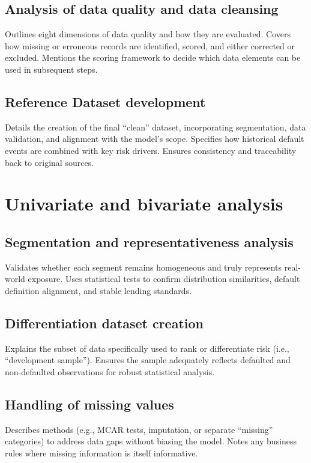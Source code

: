 \documentclass[12pt,a4paper]{article}
\begin{document}
\subsection{Analysis of data quality and data cleansing}
Outlines eight dimensions of data quality and how they are evaluated. Covers how missing or erroneous records are identified, scored, and either corrected or excluded. Mentions the scoring framework to decide which data elements can be used in subsequent steps.

\subsection{Reference Dataset development}
Details the creation of the final “clean” dataset, incorporating segmentation, data validation, and alignment with the model’s scope. Specifies how historical default events are combined with key risk drivers. Ensures consistency and traceability back to original sources.

\section{Univariate and bivariate analysis}

\subsection{Segmentation and representativeness analysis}
Validates whether each segment remains homogeneous and truly represents real-world exposure. Uses statistical tests to confirm distribution similarities, default definition alignment, and stable lending standards.

\subsection{Differentiation dataset creation}
Explains the subset of data specifically used to rank or differentiate risk (i.e., “development sample”). Ensures the sample adequately reflects defaulted and non-defaulted observations for robust statistical analysis.

\subsection{Handling of missing values}
Describes methods (e.g., MCAR tests, imputation, or separate “missing” categories) to address data gaps without biasing the model. Notes any business rules where missing information is itself informative.
\end{document}
